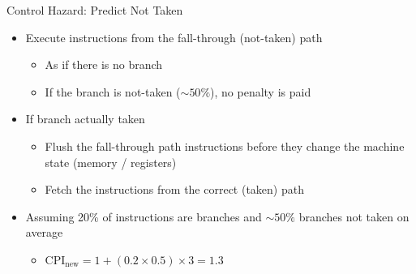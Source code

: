 \documentclass[aspectratio=169,12pt]{beamer}
\begin{document}
\begin{frame}{Control Hazard: Predict Not Taken}
    \begin{itemize}
        \item Execute instructions from the fall-through (not-taken) path
        \begin{itemize}
            \item As if there is no branch
            \item If the branch is not-taken ($\sim50\%$), no penalty is paid
        \end{itemize}
        \item If branch actually taken
        \begin{itemize}
            \item Flush the fall-through path instructions before they change the machine state (memory / registers)
            \item Fetch the instructions from the correct (taken) path
        \end{itemize}
        \item Assuming 20\% of instructions are branches and $\sim50\%$ branches not taken on average
        \begin{itemize}
            \item $\text{CPI}_{\text{new}} = 1 + (0.2 \times 0.5) \times 3 = 1.3$
        \end{itemize}
    \end{itemize}
\end{frame}
\end{document}
